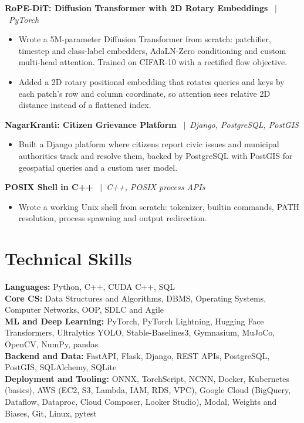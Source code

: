 \documentclass[a4paper,9pt]{extarticle}
\newcommand{\sep}{\ $\vert$\ }
\begin{document}
\textbf{RoPE-DiT: Diffusion Transformer with 2D Rotary Embeddings} \sep \textit{PyTorch}
\begin{itemize}
  \item Wrote a 5M-parameter Diffusion Transformer from scratch: patchifier, timestep and class-label embedders, AdaLN-Zero conditioning and custom multi-head attention. Trained on CIFAR-10 with a rectified flow objective.
  \item Added a 2D rotary positional embedding that rotates queries and keys by each patch's row and column coordinate, so attention sees relative 2D distance instead of a flattened index.
\end{itemize}
\vspace{2pt}

\textbf{NagarKranti: Citizen Grievance Platform} \sep \textit{Django, PostgreSQL, PostGIS}
\begin{itemize}
  \item Built a Django platform where citizens report civic issues and municipal authorities track and resolve them, backed by PostgreSQL with PostGIS for geospatial queries and a custom user model.
\end{itemize}
\vspace{2pt}

\textbf{POSIX Shell in C++} \sep \textit{C++, POSIX process APIs}
\begin{itemize}
  \item Wrote a working Unix shell from scratch: tokenizer, builtin commands, PATH resolution, process spawning and output redirection.
\end{itemize}

\section*{Technical Skills}
\textbf{Languages:} Python, C++, CUDA C++, SQL\\
\textbf{Core CS:} Data Structures and Algorithms, DBMS, Operating Systems, Computer Networks, OOP, SDLC and Agile\\
\textbf{ML and Deep Learning:} PyTorch, PyTorch Lightning, Hugging Face Transformers, Ultralytics YOLO, Stable-Baselines3, Gymnasium, MuJoCo, OpenCV, NumPy, pandas\\
\textbf{Backend and Data:} FastAPI, Flask, Django, REST APIs, PostgreSQL, PostGIS, SQLAlchemy, SQLite\\
\textbf{Deployment and Tooling:} ONNX, TorchScript, NCNN, Docker, Kubernetes (basics), AWS (EC2, S3, Lambda, IAM, RDS, VPC), Google Cloud (BigQuery, Dataflow, Dataproc, Cloud Composer, Looker Studio), Modal, Weights and Biases, Git, Linux, pytest
\end{document}
